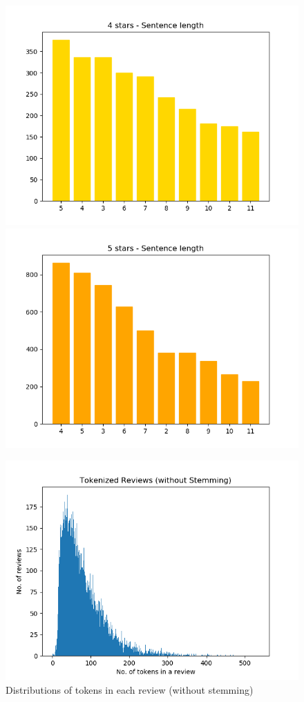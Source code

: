\begin{figure}[!h]
	\includegraphics[scale=0.3]{figures/4stars-Sentencelength.png}
	\includegraphics[scale=0.3]{figures/5stars-Sentencelength.png}
\end{figure}
\newpage
\begin{figure}[!h]
	\centering
	\caption{Distributions of tokens in each review (without stemming)}
	\includegraphics[scale=0.54]{figures/token_review.png}
\end{figure}

